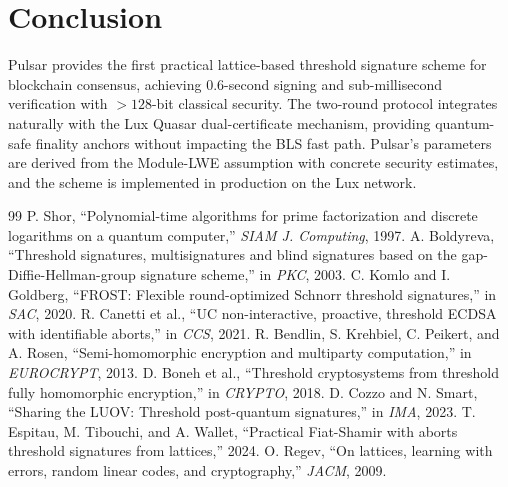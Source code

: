 \section{Conclusion}

\label{sec:conclusion}

Pulsar provides the first practical lattice-based threshold signature scheme for
blockchain consensus, achieving 0.6-second signing and sub-millisecond verification
with $> 128$-bit classical security. The two-round protocol integrates naturally with
the Lux Quasar dual-certificate mechanism, providing quantum-safe finality anchors
without impacting the BLS fast path. Pulsar's parameters are derived from the
Module-LWE assumption with concrete security estimates, and the scheme is implemented
in production on the Lux network.

\begin{thebibliography}{99}
 P. Shor, ``Polynomial-time algorithms for prime factorization and discrete logarithms on a quantum computer,'' \emph{SIAM J. Computing}, 1997.
 A. Boldyreva, ``Threshold signatures, multisignatures and blind signatures based on the gap-Diffie-Hellman-group signature scheme,'' in \emph{PKC}, 2003.
 C. Komlo and I. Goldberg, ``FROST: Flexible round-optimized Schnorr threshold signatures,'' in \emph{SAC}, 2020.
 R. Canetti et al., ``UC non-interactive, proactive, threshold ECDSA with identifiable aborts,'' in \emph{CCS}, 2021.
 R. Bendlin, S. Krehbiel, C. Peikert, and A. Rosen, ``Semi-homomorphic encryption and multiparty computation,'' in \emph{EUROCRYPT}, 2013.
 D. Boneh et al., ``Threshold cryptosystems from threshold fully homomorphic encryption,'' in \emph{CRYPTO}, 2018.
 D. Cozzo and N. Smart, ``Sharing the LUOV: Threshold post-quantum signatures,'' in \emph{IMA}, 2023.
 T. Espitau, M. Tibouchi, and A. Wallet, ``Practical Fiat-Shamir with aborts threshold signatures from lattices,'' 2024.
 O. Regev, ``On lattices, learning with errors, random linear codes, and cryptography,'' \emph{JACM}, 2009.
\end{thebibliography}

